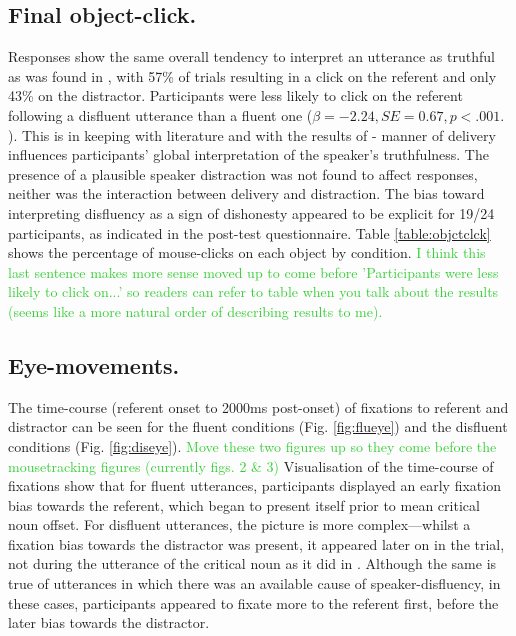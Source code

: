 \documentclass[man]{apa6}
\newcommand\thenote[1]{\textcolor{LimeGreen}{#1}}
\begin{document}
\subsection{Final object-click.}
Responses show the same overall tendency to interpret an utterance as truthful as was found in \citet{Loy2016}, with 57\% of trials resulting in a click on the referent and only 43\% on the distractor. 
Participants were less likely to click on the referent following a disfluent utterance than a fluent one ($\beta = -2.24,SE = 0.67,p<.001.$). 
This is in keeping with literature \citep{Brennan1995, Swerts2005} and with the results of \citet{Loy2016} - manner of delivery influences participants' global interpretation of the speaker's truthfulness. 
The presence of a plausible speaker distraction was not found to affect responses, neither was the interaction between delivery and distraction. 
The bias toward interpreting disfluency as a sign of dishonesty appeared to be explicit for 19/24 participants, as indicated in the post-test questionnaire. 
Table \ref{table:objctclck} shows the percentage of mouse-clicks on each object by condition.
\thenote{I think this last sentence makes more sense moved up to come before 'Participants were less likely to click on...' so readers can refer to table when you talk about the results (seems like a more natural order of describing results to me).}\\

\subsection{Eye-movements.}

The time-course (referent onset to 2000ms post-onset) of fixations to referent and distractor can be seen for the fluent conditions (Fig. \ref{fig:flueye}) and the disfluent conditions (Fig. \ref{fig:diseye}). 
\thenote{Move these two figures up so they come before the mousetracking figures (currently figs. 2 \& 3)}
Visualisation of the time-course of fixations show that for fluent utterances, participants displayed an early fixation bias towards the referent, which began to present itself prior to mean critical noun offset. 
For disfluent utterances, the picture is more complex---whilst a fixation bias towards the distractor was present, it appeared later on in the trial, not during the utterance of the critical noun as it did in \citet{Loy2016}. 
Although the same is true of utterances in which there was an available cause of speaker-disfluency, in these cases, participants appeared to fixate more to the referent first, before the later bias towards the distractor.\\
\end{document}
